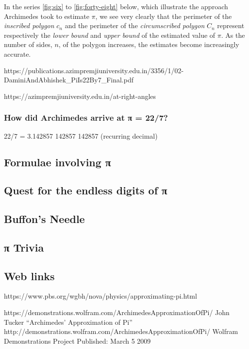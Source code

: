 \documentclass[
  a4paper,
]{article}
\begin{document}
In the series \cref{fig:six} to \cref{fig:forty-eight} below, which
illustrate the approach Archimedes took to estimate \(\pi\), we see very
clearly that the perimeter of the \emph{inscribed polygon} \(c_n\) and
the perimeter of the \emph{circumscribed polygon} \(C_n\) represent
respectively the \emph{lower bound} and \emph{upper bound} of the
estimated value of \(\pi\). As the number of sides, \(n\), of the
polygon increases, the estimates become increasingly accurate.

https://publications.azimpremjiuniversity.edu.in/3356/1/02-DaminiAndAbhishek\_PiIs22By7\_Final.pdf

https://azimpremjiuniversity.edu.in/at-right-angles

\subsubsection{How did Archimedes arrive at π =
22/7?}\label{how-did-archimedes-arrive-at-ux3c0-227}

22/7 = 3.142857 142857 142857 (recurring decimal)

\subsection{Formulae involving π}\label{formulae-involving-ux3c0}

\subsection{Quest for the endless digits of
π}\label{quest-for-the-endless-digits-of-ux3c0}

\subsection{Buffon's Needle}\label{buffons-needle}

\subsection{π Trivia}\label{ux3c0-trivia}

\subsection{Web links}\label{web-links}

https://www.pbs.org/wgbh/nova/physics/approximating-pi.html

https://demonstrations.wolfram.com/ArchimedesApproximationOfPi/ John
Tucker ``Archimedes' Approximation of Pi''
http://demonstrations.wolfram.com/ArchimedesApproximationOfPi/ Wolfram
Demonstrations Project Published: March 5 2009
\end{document}
